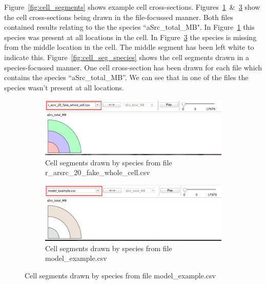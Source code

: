 Figure~\ref{fig:cell_segments} shows example cell cross-sections.  Figures~\ref{fig:cell_seg_file_fake}~\&~\ref{fig:cell_seg_file_model} show the cell cross-sections being drawn in the file-focussed manner.  Both files contained results relating to the the species ``aSrc\_total\_MB". In Figure~\ref{fig:cell_seg_file_fake} this species was present at all locations in the cell.  In Figure~\ref{fig:cell_seg_file_model} the species is missing from the middle location in the cell.  The middle segment has been left white to indicate this.  Figure~\ref{fig:cell_seg_species} shows the cell segments drawn in a species-focussed manner.  One cell cross-section has been drawn for each file which contains the species ``aSrc\_total\_MB''.  We can see that in one of the files the species wasn't present at all locations.

\begin{figure}[h!]
    \centering
    \begin{subfigure}[b]{0.9\textwidth}
        \centering
        \includegraphics[width=\textwidth]{images/by_file_fake.png}
        \caption{Cell segments drawn by species from file r\_arsrc\_20\_fake\_whole\_cell.csv}
        \label{fig:cell_seg_file_fake}
    \end{subfigure}

    \begin{subfigure}[b]{0.9\textwidth}
        \centering
        \includegraphics[width=\textwidth]{images/by_file_model.png}
        \caption{Cell segments drawn by species from file model\_example.csv}
        \label{fig:cell_seg_file_model}
    \end{subfigure}


\end{figure}

